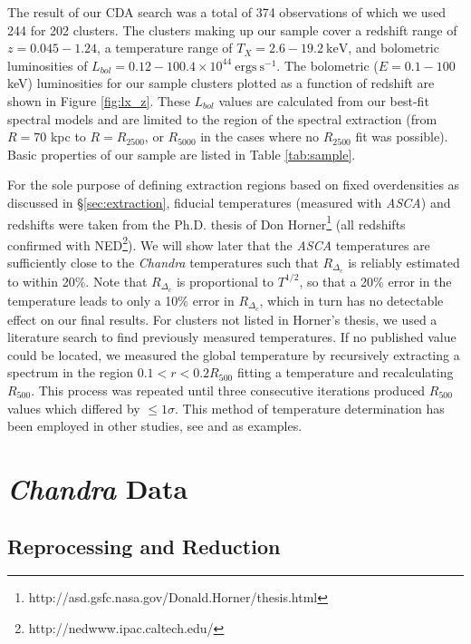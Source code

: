 \documentclass[apj]{emulateapj}
\begin{document}
The result of our CDA search was a total of 374 observations of which
we used 244 for 202 clusters. The clusters making up our sample cover
a redshift range of $z = 0.045-1.24$, a temperature range of
$T_X = 2.6-19.2 \mathrm{~keV}$, and bolometric luminosities of
$L_{bol} = 0.12-100.4\times10^{44} \mathrm{~ergs~s}^{-1}$. The
bolometric ($E = 0.1-100$ keV) luminosities for our sample clusters
plotted as a function of redshift are shown in Figure
\ref{fig:lx_z}. These $L_{bol}$ values are calculated from our
best-fit spectral models and are limited to the region of the spectral
extraction (from $R=70$ kpc to $R=R_{2500}$, or $R_{5000}$ in the
cases where no $R_{2500}$ fit was possible). Basic properties of our
sample are listed in Table \ref{tab:sample}.

For the sole purpose of defining extraction regions based on fixed
overdensities as discussed in \S\ref{sec:extraction}, fiducial
temperatures (measured with {\it ASCA}) and redshifts were taken from
the Ph.D. thesis of Don
Horner\footnote{http://asd.gsfc.nasa.gov/Donald.Horner/thesis.html}
(all redshifts confirmed with
NED\footnote{http://nedwww.ipac.caltech.edu/}). We will show later
that the {\it ASCA} temperatures are sufficiently close to the {\it
Chandra} temperatures such that $R_{\Delta_c}$ is reliably estimated
to within 20\%. Note that $R_{\Delta_c}$ is proportional to $T^{1/2}$,
so that a 20\% error in the temperature leads to only a 10\% error in
$R_{\Delta_c}$, which in turn has no detectable effect on our final
results. For clusters not listed in Horner's thesis, we used a
literature search to find previously measured temperatures. If no
published value could be located, we measured the global temperature
by recursively extracting a spectrum in the region $0.1<r<0.2
R_{500}$ fitting a temperature and recalculating $R_{500}$. This
process was repeated until three consecutive iterations produced
$R_{500}$ values which differed by $\leq 1\sigma$. This method of
temperature determination has been employed in other studies, see
\cite{2006MNRAS.tmp.1068S} and \cite{2006ApJS..162..304H} as
examples.

\section{{\it Chandra} Data}\label{sec:data}

\subsection{Reprocessing and Reduction}\label{sec:reprocessing}
\end{document}
